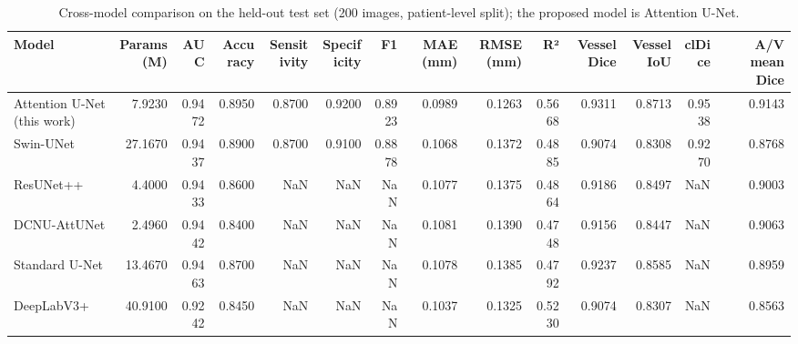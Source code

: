 \begin{table}
\caption{Cross-model comparison on the held-out test set (200 images, patient-level split); the proposed model is Attention U-Net.}
\label{tab:cross_model_comparison}
\begin{tabular}{lrrrrrrrrrrrrr}
\toprule
Model & Params (M) & AUC & Accuracy & Sensitivity & Specificity & F1 & MAE (mm) & RMSE (mm) & R² & Vessel Dice & Vessel IoU & clDice & A/V mean Dice \\
\midrule
Attention U-Net (this work) & 7.9230 & 0.9472 & 0.8950 & 0.8700 & 0.9200 & 0.8923 & 0.0989 & 0.1263 & 0.5668 & 0.9311 & 0.8713 & 0.9538 & 0.9143 \\
Swin-UNet & 27.1670 & 0.9437 & 0.8900 & 0.8700 & 0.9100 & 0.8878 & 0.1068 & 0.1372 & 0.4885 & 0.9074 & 0.8308 & 0.9270 & 0.8768 \\
ResUNet++ & 4.4000 & 0.9433 & 0.8600 & NaN & NaN & NaN & 0.1077 & 0.1375 & 0.4864 & 0.9186 & 0.8497 & NaN & 0.9003 \\
DCNU-AttUNet & 2.4960 & 0.9442 & 0.8400 & NaN & NaN & NaN & 0.1081 & 0.1390 & 0.4748 & 0.9156 & 0.8447 & NaN & 0.9063 \\
Standard U-Net & 13.4670 & 0.9463 & 0.8700 & NaN & NaN & NaN & 0.1078 & 0.1385 & 0.4792 & 0.9237 & 0.8585 & NaN & 0.8959 \\
DeepLabV3+ & 40.9100 & 0.9242 & 0.8450 & NaN & NaN & NaN & 0.1037 & 0.1325 & 0.5230 & 0.9074 & 0.8307 & NaN & 0.8563 \\
\bottomrule
\end{tabular}
\end{table}
